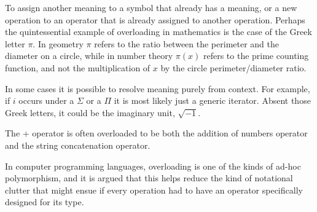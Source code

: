 \documentclass[12pt]{article}
\begin{document}
To assign another meaning to a symbol that already has a meaning, or a new operation to an operator that is already assigned to another operation. Perhaps the quintessential example of overloading in mathematics is the case of the Greek letter $\pi$. In geometry $\pi$ refers to the ratio between the perimeter and the diameter on a circle, while in number theory $\pi(x)$ refers to the prime counting function, and not the multiplication of $x$ by the circle perimeter/diameter ratio.

In some cases it is possible to resolve meaning purely from context. For example, if $i$ occurs under a $\Sigma$ or a $\Pi$ it is most likely just a generic iterator. Absent those Greek letters, it could be the imaginary unit, $\sqrt{-1}$.

The + operator is often overloaded to be both the addition of numbers operator and the string concatenation operator.

In computer programming languages, overloading is one of the kinds of ad-hoc polymorphism, and it is argued that this helps reduce the kind of notational clutter that might ensue if every operation had to have an operator specifically designed for its type.
\end{document}
